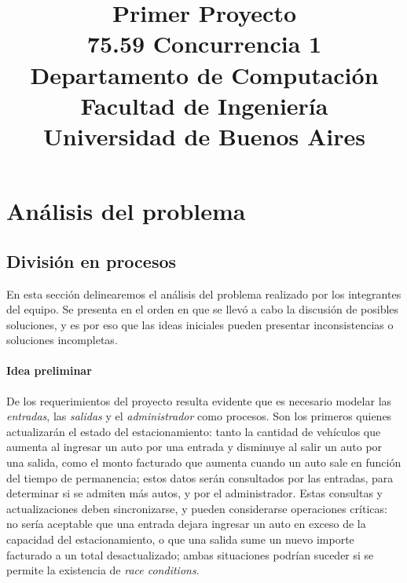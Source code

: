 \documentclass{article}
\title{Primer Proyecto\\75.59 Concurrencia 1\\Departamento de Computación\\Facultad de Ingeniería\\ Universidad de Buenos Aires}
\author{}
\begin{document}
\maketitle
\clearpage

\tableofcontents
\clearpage

\section{Análisis del problema}
    \subsection{División en procesos}
        En esta sección delinearemos el análisis del problema
        realizado por los integrantes del equipo. Se presenta
        en el orden en que se llevó a cabo la discusión de
        posibles soluciones, y es por eso que las ideas iniciales
        pueden presentar inconsistencias o soluciones
        incompletas.
    
        \paragraph{Idea preliminar} De los requerimientos del
        proyecto resulta evidente que es necesario modelar las
        \emph{entradas}, las \emph{salidas} y el \emph{
        administrador} como procesos. Son los primeros
        quienes actualizarán el estado del estacionamiento:
        tanto la cantidad de vehículos que aumenta al ingresar
        un auto por una entrada y disminuye al salir un auto por
        una salida, como el monto facturado que aumenta cuando
        un auto sale en función del tiempo de permanencia; estos
        datos serán consultados por las entradas, para
        determinar si se admiten más autos, y por el
        administrador. Estas consultas y actualizaciones deben
        sincronizarse, y pueden considerarse operaciones
        críticas: no sería aceptable que una entrada dejara
        ingresar un auto en exceso de la capacidad del
        estacionamiento, o que una salida sume un nuevo importe
        facturado a un total desactualizado; ambas situaciones
        podrían suceder si se permite la existencia de
        \emph{race conditions}.
        
\end{document}
